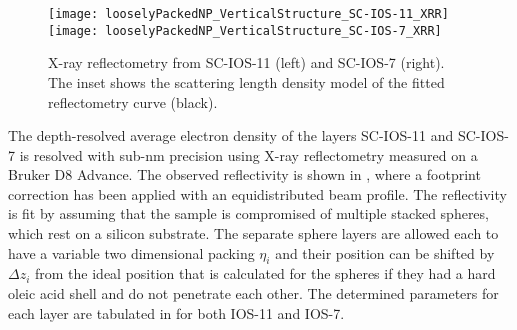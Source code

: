 \documentclass[\main/dresen_thesis.tex]{subfiles}
\begin{document}
  \label{sec:looselyPackedNS:layers:pnr}
  \begin{figure}[tb]
    \centering
    \texttt{[image: looselyPackedNP\_VerticalStructure\_SC-IOS-11\_XRR]}
    \texttt{[image: looselyPackedNP\_VerticalStructure\_SC-IOS-7\_XRR]}
    \caption{\label{fig:looselyPackedNP:layer:xrr}X-ray reflectometry from SC-IOS-11 (left) and SC-IOS-7 (right). The inset shows the scattering length density model of the fitted reflectometry curve (black).}
  \end{figure}

  The depth-resolved average electron density of the layers SC-IOS-11 and SC-IOS-7 is resolved with sub-nm precision using X-ray reflectometry measured on a Bruker D8 Advance.
  The observed reflectivity is shown in , where a footprint correction has been applied with an equidistributed beam profile.
  The reflectivity is fit by assuming that the sample is compromised of multiple stacked spheres, which rest on a silicon substrate.
  The separate sphere layers are allowed each to have a variable two dimensional packing $\eta_i$ and their position can be shifted by $\Delta z_i$ from the ideal position that is calculated for the spheres if they had a hard oleic acid shell and do not penetrate each other.
  The determined parameters for each layer are tabulated in  for both IOS-11 and IOS-7.
\end{document}
